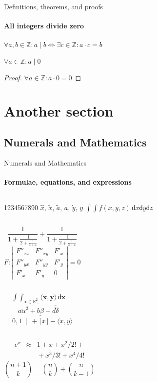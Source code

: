 \documentclass[aspectratio=1610, compress]{beamer}
\begin{document}
\begin{frame}[label=proof]{Definitions, theorems, and proofs}
\framesubtitle{All integers divide zero}
\begin{definition}
$\forall a,b\in\mathds{Z}: a\mid b\iff\exists c\in\mathds{Z}:a\cdot c=b$
\end{definition}
\begin{theorem}
$\forall a\in\mathds{Z}: a\mid 0$
\end{theorem}
\begin{proof}[Proof\nopunct]
$\forall a\in\mathds{Z}: a\cdot 0=0$
\end{proof}
\end{frame}

\section{Another section}
\subsection{Numerals and Mathematics}
\begin{frame}[label=math]{Numerals and Mathematics}
\framesubtitle{Formulae, equations, and expressions}
\begin{columns}[onlytextwidth]
1234567890
$\hat{x}$, $\check{x}$, $\tilde{a}$,
$\bar{a}$, $\dot{y}$, $\ddot{y}$
$\int \!\! \int f(x,y,z)\,\mathsf{d}x\mathsf{d}y\mathsf{d}z$
\end{columns}
\begin{columns}[onlytextwidth]
$$\frac{1}{\displaystyle 1+
\frac{1}{\displaystyle 2+
\frac{1}{\displaystyle 3+x}}} +
\frac{1}{1+\frac{1}{2+\frac{1}{3+x}}}$$
$$F:\left| \begin{array}{ccc}
F''_{xx} & F''_{xy} &  F'_x \\
F''_{yx} & F''_{yy} &  F'_y \\
F'_x     & F'_y     & 0
\end{array}\right| = 0$$
\end{columns}
\begin{columns}[onlytextwidth]
$$\mathop{\int \!\!\! \int}_{\mathbf{x} \in \mathds{R}^2}
\! \langle \mathbf{x},\mathbf{y}\rangle\,\mathsf{d}\mathbf{x}$$
$$\overline{\overline{a\alpha}^2+\underline{b\beta}
+\overline{\overline{d\delta}}}$$
$\left] 0,1\right[ + \lceil x \rfloor - \langle x,y\rangle$
\end{columns}
\begin{columns}[onlytextwidth]
\begin{eqnarray*}
e^x &\approx& 1+x+x^2/2! + \\
&& {}+x^3/3! + x^4/4!
\end{eqnarray*}
$${n+1\choose k} = {n\choose k} + {n \choose k-1}$$
\end{columns}
\end{frame}
\end{document}
